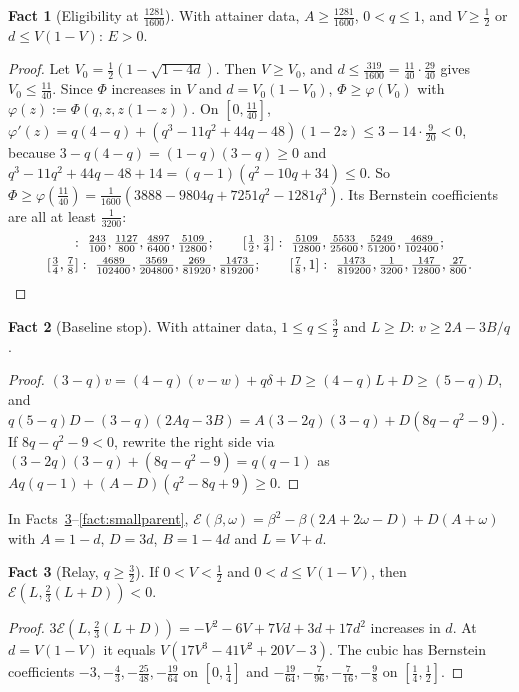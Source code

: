 \documentclass[11pt,a4paper]{article}
\numberwithin{equation}{section}
\theoremstyle{definition}
\newtheorem{fact}{Fact}
\newcommand{\cE}{\mathcal E}
\begin{document}
\begin{fact}[Eligibility at $\frac{1281}{1600}$]\label{fact:elig1281}
With attainer data, $A\ge\frac{1281}{1600}$, $0<q\le1$, and $V\ge\frac12$ or
$d\le V(1-V)$: $E>0$.
\end{fact}
\begin{proof}
Let $V_0=\frac12(1-\sqrt{1-4d})$. Then $V\ge V_0$, and
$d\le\frac{319}{1600}=\frac{11}{40}\cdot\frac{29}{40}$ gives $V_0\le\frac{11}{40}$.
Since $\Phi$ increases in $V$ and $d=V_0(1-V_0)$, $\Phi\ge\varphi(V_0)$ with
$\varphi(z):=\Phi(q,z,z(1-z))$. On $[0,\frac{11}{40}]$,
$\varphi'(z)=q(4-q)+(q^3-11q^2+44q-48)(1-2z)\le3-14\cdot\frac9{20}<0$, because
$3-q(4-q)=(1-q)(3-q)\ge0$ and $q^3-11q^2+44q-48+14=(q-1)(q^2-10q+34)\le0$. So
$\Phi\ge\varphi(\frac{11}{40})=\frac1{1600}(3888-9804q+7251q^2-1281q^3)$. Its
Bernstein coefficients are all at least $\frac1{3200}$:
\begin{gather*}
[0,\tfrac12]:\ \tfrac{243}{100},\tfrac{1127}{800},\tfrac{4897}{6400},\tfrac{5109}{12800};\qquad
[\tfrac12,\tfrac34]:\ \tfrac{5109}{12800},\tfrac{5533}{25600},\tfrac{5249}{51200},\tfrac{4689}{102400};\\
[\tfrac34,\tfrac78]:\ \tfrac{4689}{102400},\tfrac{3569}{204800},\tfrac{269}{81920},\tfrac{1473}{819200};\qquad
[\tfrac78,1]:\ \tfrac{1473}{819200},\tfrac1{3200},\tfrac{147}{12800},\tfrac{27}{800}.
\qedhere
\end{gather*}
\end{proof}

\begin{fact}[Baseline stop]\label{fact:stop}With attainer data, $1\le q\le\frac32$ and $L\ge D$: $v\ge2A-3B/q$.
\end{fact}
\begin{proof}
$(3-q)v=(4-q)(v-w)+q\delta+D\ge(4-q)L+D\ge(5-q)D$, and
$q(5-q)D-(3-q)(2Aq-3B)=A(3-2q)(3-q)+D(8q-q^2-9)$. If $8q-q^2-9<0$, rewrite the
right side via $(3-2q)(3-q)+(8q-q^2-9)=q(q-1)$ as
$Aq(q-1)+(A-D)(q^2-8q+9)\ge0$.
\end{proof}

In Facts~\ref{fact:highq}--\ref{fact:smallparent},
$\cE(\beta,\omega)=\beta^2-\beta(2A+2\omega-D)+D(A+\omega)$ with $A=1-d$,
$D=3d$, $B=1-4d$ and $L=V+d$.

\begin{fact}[Relay, $q\ge\frac32$]\label{fact:highq}If $0<V<\frac12$ and $0<d\le V(1-V)$, then $\cE(L,\frac23(L+D))<0$.
\end{fact}
\begin{proof}
$3\cE(L,\frac23(L+D))=-V^2-6V+7Vd+3d+17d^2$ increases in $d$. At
$d=V(1-V)$ it equals $V(17V^3-41V^2+20V-3)$. The cubic has Bernstein
coefficients $-3,-\frac43,-\frac{25}{48},-\frac{19}{64}$ on $[0,\frac14]$ and
$-\frac{19}{64},-\frac7{96},-\frac7{16},-\frac98$ on $[\frac14,\frac12]$.
\end{proof}
\end{document}
